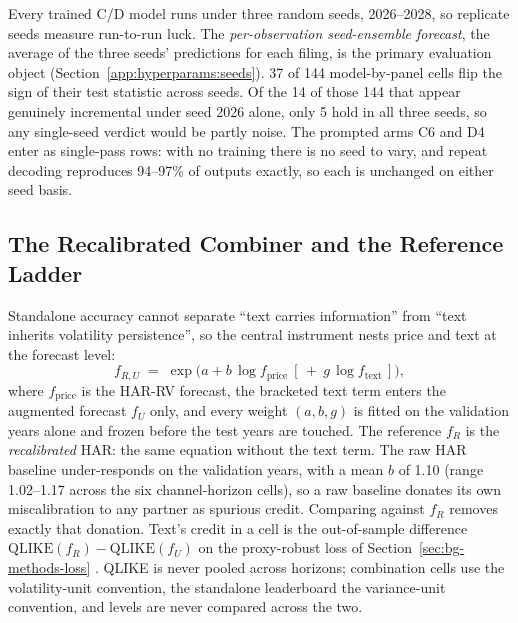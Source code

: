 Every trained C/D model runs under three random seeds, 2026--2028, so replicate seeds measure run-to-run luck. %
The \emph{per-observation seed-ensemble forecast}, the average of the three seeds' predictions for each filing, is the primary evaluation object (Section~\ref{app:hyperparams:seeds}). 37 of 144 model-by-panel cells flip the sign of their test statistic across seeds. Of the 14 of those 144 that appear genuinely incremental under seed 2026 alone, only 5 hold in all three seeds, so any single-seed verdict would be partly noise. %
The prompted arms C6 and D4 enter as single-pass rows: with no training there is no seed to vary, and repeat decoding reproduces 94--97\% of outputs exactly, so each is unchanged on either seed basis. %

\subsection{The Recalibrated Combiner and the Reference Ladder}
\label{sec:design-ladder}

Standalone accuracy cannot separate ``text carries information'' from ``text inherits volatility persistence'', so the central instrument nests price and text at the forecast level:
\begin{equation}
f_{R,U} \;=\; \exp\!\bigl(a + b\,\log f_{\text{price}}\ [\,+\ g\,\log f_{\text{text}}\,]\bigr),
\label{eq:m1}
\end{equation}
where $f_{\text{price}}$ is the HAR-RV forecast, the bracketed text term enters the augmented forecast $f_U$ only, and every weight $(a, b, g)$ is fitted on the validation years alone and frozen before the test years are touched. %
The reference $f_R$ is the \emph{recalibrated} HAR: the same equation without the text term. The raw HAR baseline under-responds on the validation years, with a mean $b$ of 1.10 (range 1.02--1.17 across the six channel-horizon cells), %
so a raw baseline donates its own miscalibration to any partner as spurious credit. Comparing against $f_R$ removes exactly that donation. Text's credit in a cell is the out-of-sample difference $\mathrm{QLIKE}(f_R) - \mathrm{QLIKE}(f_U)$ on the proxy-robust loss of Section~\ref{sec:bg-methods-loss} \cite{patton2011proxies}. QLIKE is never pooled across horizons; combination cells use the volatility-unit convention, the standalone leaderboard the variance-unit convention, and levels are never compared across the two. %

